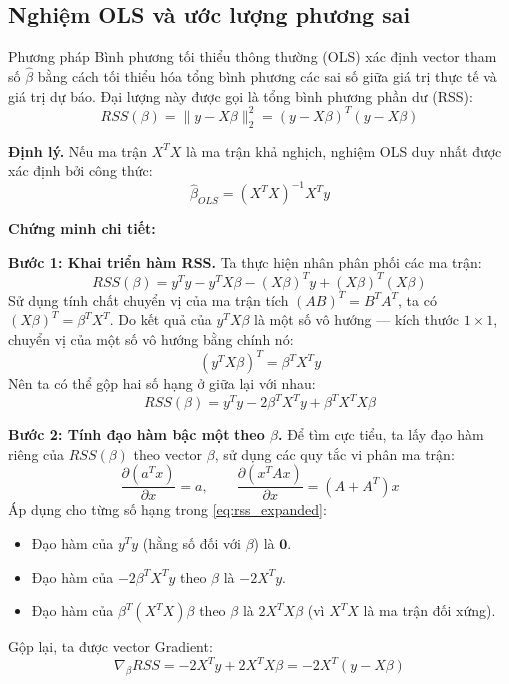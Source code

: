 \documentclass[a4paper]{article}
\begin{document}
\subsection{Nghiệm OLS và ước lượng phương sai}

Phương pháp Bình phương tối thiểu thông thường (OLS) xác định vector tham số $\hat{\beta}$ bằng cách tối thiểu hóa tổng bình phương các sai số giữa giá trị thực tế và giá trị dự báo. Đại lượng này được gọi là tổng bình phương phần dư (RSS):
\begin{equation}
RSS(\beta) = \lVert y - X\beta \rVert_2^2 = (y - X\beta)^T(y - X\beta)
\end{equation}

\textbf{Định lý.} Nếu ma trận $X^TX$ là ma trận khả nghịch, nghiệm OLS duy nhất được xác định bởi công thức:
\begin{equation}
\hat{\beta}_{OLS} = (X^TX)^{-1}X^Ty
\end{equation}

\textbf{Chứng minh chi tiết:}

\textbf{Bước 1: Khai triển hàm RSS.}
Ta thực hiện nhân phân phối các ma trận:
\[RSS(\beta) = y^Ty - y^TX\beta - (X\beta)^Ty + (X\beta)^T(X\beta)\]
Sử dụng tính chất chuyển vị của ma trận tích $(AB)^T = B^TA^T$, ta có $(X\beta)^T = \beta^TX^T$. Do kết quả của $y^TX\beta$ là một số vô hướng --- kích thước $1 \times 1$, chuyển vị của một số vô hướng bằng chính nó:
\[(y^TX\beta)^T = \beta^TX^Ty\]
Nên ta có thể gộp hai số hạng ở giữa lại với nhau:
\begin{equation}\label{eq:rss_expanded}
RSS(\beta) = y^Ty - 2\beta^TX^Ty + \beta^TX^TX\beta
\end{equation}

\textbf{Bước 2: Tính đạo hàm bậc một} \textbf{theo $\beta$.}
Để tìm cực tiểu, ta lấy đạo hàm riêng của $RSS(\beta)$ theo vector $\beta$, sử dụng các quy tắc vi phân ma trận:
\[\frac{\partial (a^Tx)}{\partial x} = a, \qquad \frac{\partial (x^TAx)}{\partial x} = (A + A^T)x\]
Áp dụng cho từng số hạng trong \eqref{eq:rss_expanded}:
\begin{itemize}
    \item Đạo hàm của $y^Ty$ (hằng số đối với $\beta$) là $\mathbf{0}$.
    \item Đạo hàm của $-2\beta^TX^Ty$ theo $\beta$ là $-2X^Ty$.
    \item Đạo hàm của $\beta^T(X^TX)\beta$ theo $\beta$ là $2X^TX\beta$ (vì $X^TX$ là ma trận đối xứng).
\end{itemize}
Gộp lại, ta được vector Gradient:
\begin{equation}\label{eq:gradient_rss}
\nabla_{\beta}RSS = -2X^Ty + 2X^TX\beta = -2X^T(y - X\beta)
\end{equation}
\end{document}
